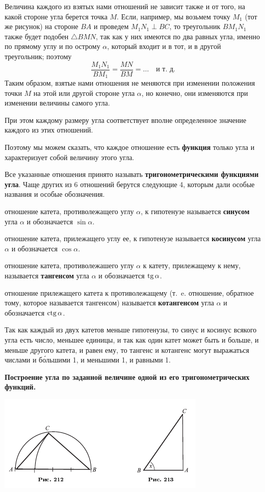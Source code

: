 \documentclass[oneside]{book}
\begin{document}
Величина каждого из взятых нами отношений не зависит также и от того, на какой стороне угла берется точка $M$.
Если, например, мы возьмем точку $M_1$ (тот же рисунок) на стороне $BA$ и проведем $M_1N_1\perp BC$, то треугольник $BM_1N_1$ также будет подобен $\triangle BMN$, так как у них имеются по два равных угла, именно по прямому углу и по острому $\alpha$, который входит и в тот, и в другой треугольник;
поэтому
\[\frac{M_1N_1}{BM_1}=\frac{MN}{BM}=\dots\quad\text{и т.~д.}\]
Таким образом, взятые нами отношения не меняются при изменении положения точки $M$ на этой или другой стороне угла $\alpha$, но конечно, они изменяются при изменении величины самого угла.

При этом каждому размеру угла соответствует вполне определенное значение каждого из этих отношений.

Поэтому мы можем сказать, что каждое отношение есть \textbf{функция} только угла и характеризует собой величину этого угла.

Все указанные отношения принято называть \textbf{тригонометрическими функциями угла}.
Чаще других из 6 отношений берутся следующие 4, которым дали особые названия и особые обозначения.

отношение катета, противолежащего углу $\alpha$, к гипотенузе называется \textbf{синусом} угла $\alpha$ и обозначается $\sin \alpha$.

отношение катета, прилежащего углу ее, к гипотенузе называется \textbf{косинусом} угла $\alpha$ и обозначается $\cos\alpha$.

отношение катета, противолежашего углу $\alpha$ к катету, прилежащему к нему, называется \textbf{тангенсом} угла $\alpha$ и обозначается $\mathrm{tg}\,\alpha$.

отношение прилежащего катета к противолежащему (т.~e.
отношение, обратное тому, которое называется тангенсом) называется \textbf{котангенсом} угла $\alpha$ и обозначается $\mathrm{ctg}\,\alpha$.

Так как каждый из двух катетов меньше гипотенузы, то синус и косинус всякого угла есть число, меньшее единицы, и так как один катет может быть и больше, и меньше другого катета, и равен ему, то тангенс и котангенс могут выражаться числами и б\'{о}льшими 1, и меньшими 1, и равными 1.

\textbf{Построение угла по заданной величине одной из его тригонометрических функций.}

\includegraphics{pics/ris-212-213}
\end{document}
